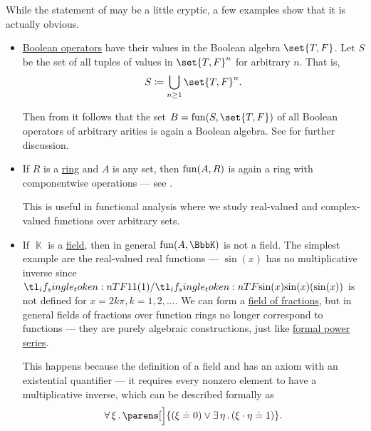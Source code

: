 \begin{example}\label{ex:thm:functions_over_model_of_positive_formulas_form_model}
  While the statement of  may be a little cryptic, a few examples show that it is actually obvious.
  \begin{itemize}
    \item \hyperref[def:boolean_operator]{Boolean operators} have their values in the Boolean algebra \( \set{ T, F } \). Let \( S \) be the set of all tuples of values in \( \set{ T, F }^n \) for arbitrary \( n \). That is,
    \begin{equation*}
      S \coloneqq \bigcup_{n \geq 1} \set{ T, F }^n.
    \end{equation*}

    Then from  it follows that the set \( B = \fun(S, \set{ T, F }) \) of all Boolean operators of arbitrary arities is again a Boolean algebra. See  for further discussion.

    \item If \( R \) is a \hyperref[def:ring]{ring} and \( A \) is any set, then \( \operatorname{fun}(A, R) \) is again a ring with componentwise operations --- see .

    This is useful in functional analysis where we study real-valued and complex-valued functions over arbitrary sets.

    \item If \( \BbbK \) is a \hyperref[def:field]{field}, then in general \( \fun(A, \BbbK) \) is not a field. The simplest example are the real-valued real functions --- \( \sin(x) \) has no multiplicative inverse since \( \ifrac 1 {\sin(x)} \) is not defined for \( x = 2k\pi, k = 1, 2, \ldots \). We can form a \hyperref[def:ring_localization]{field of fractions}, but in general fields of fractions over function rings no longer correspond to functions --- they are purely algebraic constructions, just like \hyperref[def:formal_power_series]{formal power series}.

    This happens because the definition of a field and has an axiom with an existential quantifier --- it requires every nonzero element to have a multiplicative inverse, which can be described formally as
    \begin{equation*}
      \qforall \xi \parens[\Big]{ (\xi \doteq 0) \vee \qexists \eta (\xi \cdot \eta \doteq 1) }.
    \end{equation*}
  \end{itemize}
\end{example}

